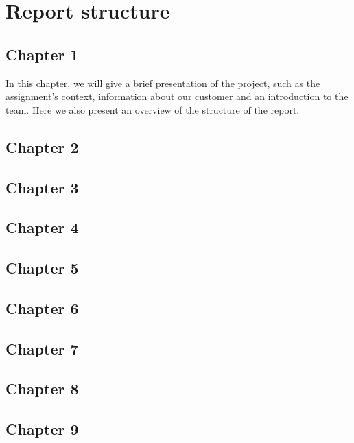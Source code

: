 \section{Report structure}
\subsection*{Chapter 1}
In this chapter, we will give a brief presentation of the project, such as the assignment's context, information about our customer and an introduction to the team. Here we also present an overview of the structure of the report.

\subsection*{Chapter 2}
\subsection*{Chapter 3}
\subsection*{Chapter 4}
\subsection*{Chapter 5}
\subsection*{Chapter 6}
\subsection*{Chapter 7}
\subsection*{Chapter 8}
\subsection*{Chapter 9}
